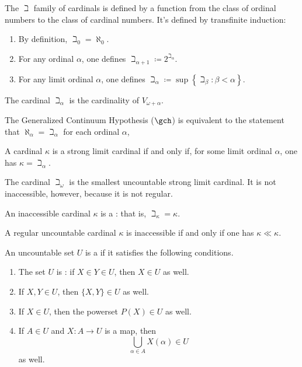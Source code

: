 \begin{eg}
	The $\beth$ family of cardinals is defined by a function from the class of ordinal numbers to the class of cardinal numbers.
	It's defined by transfinite induction:
	\begin{enumerate}
		\item By definition, $ \beth_0 = \aleph_0 $.
		\item For any ordinal $ \alpha $, one defines $ \beth_{\alpha+1} \coloneq 2^{\beth_{\alpha}} $.
		\item For any limit ordinal $ \alpha $,
			one defines $ \beth_{\alpha} \coloneq \sup \left\{ \beth_{\beta} : \beta < \alpha \right\} $.
	\end{enumerate}
	The cardinal $ \beth_{\alpha} $ is the cardinality of $ V_{\omega+\alpha} $.

	The Generalized Continuum Hypothesis ($ \gch $) is equivalent to the statement that
	$ \aleph_{\alpha} = \beth_{\alpha} $ for each ordinal $ \alpha $,	
	
	A cardinal $ \kappa $ is a strong limit cardinal if and only if,
	for some limit ordinal $ \alpha $, one has $ \kappa = \beth_{\alpha} $.

	The cardinal $ \beth_{\omega} $ is
	the smallest uncountable strong limit cardinal.
	It is not inaccessible, however,
	because it is not regular.

	An inaccessible cardinal $ \kappa $ is
	a :
	that is, $ \beth_{\kappa} = \kappa $.
\end{eg}

\begin{nul}
	A regular uncountable cardinal $ \kappa $
	is inaccessible if and only if
	one has $ \kappa \ll \kappa $.
\end{nul}

\begin{definition}%
\label{dfn:uni}
	An uncountable set $ U $ is a  if it satisfies the following conditions.
	\begin{enumerate}
		\item The set $ U $ is :
			if $ X \in Y \in U $, then $ X \in U $ as well.
		\item If $ X, Y \in U $, then $ \{X,Y\} \in U $ as well.
		\item If $ X \in U $, then the powerset $ P(X) \in U $ as well.
		\item If $ A \in U $ and $ X \colon A \to U $ is a map, then
		\[ \bigcup_{\alpha\in A}X(\alpha) \in U \]
		as well.
	\end{enumerate}
\end{definition}

